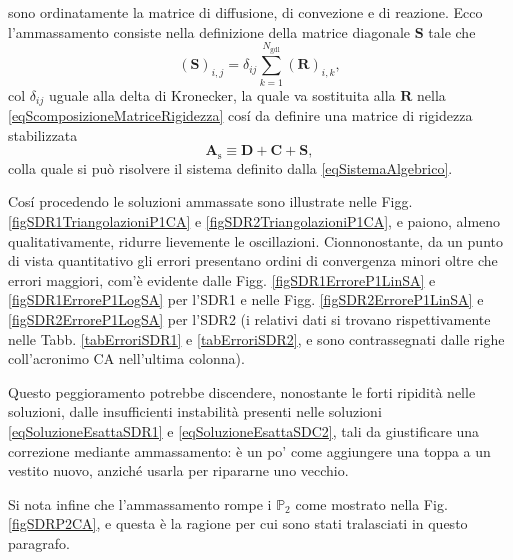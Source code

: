 \documentclass{article}
\newcommand{\Ngdl}{N_{\text{gdl}}}
\begin{document}
                sono ordinatamente la matrice di diffusione, di convezione e di reazione. Ecco l'ammassamento consiste nella definizione della matrice diagonale $\mathbf S$ tale che
                \begin{equation*}
                    (\mathbf S)_{i,j}=\delta_{ij}\sum_{k=1}^{\Ngdl}(\mathbf R)_{i,k},
                    \label{eqTrasformazioneMatriceR}
                \end{equation*}
                col $\delta_{ij}$ uguale alla delta di Kronecker, la quale va sostituita alla $\mathbf R$ nella \eqref{eqScomposizioneMatriceRigidezza} cosí da definire una matrice di rigidezza stabilizzata
                \begin{equation*}
                    \mathbf A_\text{s}\equiv\mathbf D+\mathbf C+\mathbf S,
                    \label{eqScomposizioneMatriceRigidezzaAmmassata}
                \end{equation*}
                colla quale si può risolvere il sistema definito dalla \eqref{eqSistemaAlgebrico}.

                Cosí procedendo le soluzioni ammassate sono illustrate nelle Figg. \ref{figSDR1TriangolazioniP1CA} e \ref{figSDR2TriangolazioniP1CA}, e paiono, almeno qualitativamente, ridurre lievemente le oscillazioni. Cionnonostante, da un punto di vista quantitativo gli errori presentano ordini di convergenza minori oltre che errori maggiori, com'è evidente dalle Figg. \ref{figSDR1ErroreP1LinSA} e \ref{figSDR1ErroreP1LogSA} per l'SDR1 e nelle Figg. \ref{figSDR2ErroreP1LinSA} e \ref{figSDR2ErroreP1LogSA} per l'SDR2 (i relativi dati si trovano rispettivamente nelle Tabb. \ref{tabErroriSDR1} e \ref{tabErroriSDR2}, e sono contrassegnati dalle righe coll'acronimo CA nell'ultima colonna).

                Questo peggioramento potrebbe discendere, nonostante le forti ripidità nelle soluzioni, dalle insufficienti instabilità presenti nelle soluzioni \eqref{eqSoluzioneEsattaSDR1} e \eqref{eqSoluzioneEsattaSDC2}, tali da giustificare una correzione mediante ammassamento: è un po' come aggiungere una toppa a un vestito nuovo, anziché usarla per ripararne uno vecchio.

                Si nota infine che l'ammassamento rompe i $\mathbb P_2$ come mostrato nella Fig. \ref{figSDRP2CA}, e questa è la ragione per cui sono stati tralasciati in questo paragrafo.
\end{document}

